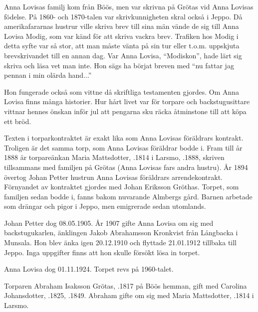 Anna Lovisas familj kom från Böös, men var skrivna på Grötas vid Anna Lovisas födelse. På 1860- och 1870-talen var skrivkunnigheten skral också i Jeppo. Då amerikafararnas hustrur ville skriva brev till sina män vände de sig till Anna Lovisa Modig, som var känd för att skriva vackra brev. Trafiken hos Modig i detta syfte var så stor, att man måste vänta på sin tur eller t.o.m. uppskjuta brevskrivandet till en annan dag. Var Anna Lovisa, ``Modiskon'', hade lärt sig skriva och läsa vet man inte. Hon sägs ha börjat breven med ``nu fattar jag pennan i min olärda hand...''

Hon fungerade också som vittne då skriftliga testamenten gjordes. Om Anna Lovisa finns många historier. Hur hårt livet var för torpare och backstugusittare vittnar hennes önskan inför jul att pengarna sku räcka åtminstone till att köpa ett bröd.

Texten i torparkontraktet är exakt lika som Anna Lovisas föräldrars kontrakt. Troligen är det samma torp, som Anna Lovisas föräldrar bodde i. Fram till år 1888 är torpareänkan Maria Mattsdotter, .1814 i Larsmo, .1888, skriven tillsammans med familjen på Grötas (Anna Lovisas fars andra hustru). År 1894 övertog Johan Petter  hustrun Anna Lovisas föräldrars arrendekontrakt. Förnyandet av kontraktet gjordes med Johan Eriksson Gröthas. Torpet, som familjen sedan bodde i, fanns bakom nuvarande Almbergs gård. Barnen arbetade som drängar och pigor i Jeppo, men emigrerade sedan utomlands.

Johan Petter dog 08.05.1905. År 1907 gifte Anna Lovisa om sig med backstugukarlen, änklingen Jakob Abrahamsson Kronkvist från Långbacka i Munsala. Hon blev änka igen 20.12.1910 och flyttade 21.01.1912 tillbaka till Jeppo. Inga uppgifter finns att hon skulle försökt lösa in torpet.

Anna Lovisa dog 01.11.1924. Torpet revs på 1960-talet.


%
Torparen Abraham Isaksson Grötas, .1817 på Böös hemman, gift med Carolina Johansdotter, .1825, .1849. Abraham gifte om sig med Maria Mattsdotter, .1814 i Larsmo.
\begin{jhchildren}
  \item {}
  \item {}
  \item {}
\end{jhchildren}

